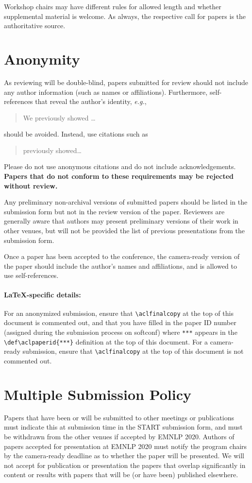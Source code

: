 \documentclass[11pt,a4paper]{article}
\begin{document}
Workshop chairs may have different rules for allowed length and whether supplemental material is welcome.
As always, the respective call for papers is the authoritative source.


\section{Anonymity}
As reviewing will be double-blind, papers submitted for review should not include any author information (such as names or affiliations). Furthermore, self-references that reveal the author's identity, \emph{e.g.},
\begin{quote}
We previously showed \citep{Gusfield:97} \ldots
\end{quote}
should be avoided. Instead, use citations such as 
\begin{quote}
\citet{Gusfield:97} previously showed\ldots
\end{quote}
Please do not use anonymous citations and do not include acknowledgements.
\textbf{Papers that do not conform to these requirements may be rejected without review.}

Any preliminary non-archival versions of submitted papers should be listed in the submission form but not in the review version of the paper.
Reviewers are generally aware that authors may present preliminary versions of their work in other venues, but will not be provided the list of previous presentations from the submission form.

Once a paper has been accepted to the conference, the camera-ready version of the paper should include the author's names and affiliations, and is allowed to use self-references.

\paragraph{\LaTeX-specific details:}
For an anonymized submission, ensure that {\small\verb|\aclfinalcopy|} at the top of this document is commented out, and that you have filled in the paper ID number (assigned during the submission process on softconf) where {\small\verb|***|} appears in the {\small\verb|\def\aclpaperid{***}|} definition at the top of this document.
For a camera-ready submission, ensure that {\small\verb|\aclfinalcopy|} at the top of this document is not commented out.


\section{Multiple Submission Policy}
Papers that have been or will be submitted to other meetings or publications must indicate this at submission time in the START submission form, and must be withdrawn from the other venues if accepted by EMNLP 2020. Authors of papers accepted for presentation at EMNLP 2020 must notify the program chairs by the camera-ready deadline as to whether the paper will be presented. We will not accept for publication or presentation the papers that overlap significantly in content or results with papers that will be (or have been) published elsewhere.
\end{document}
